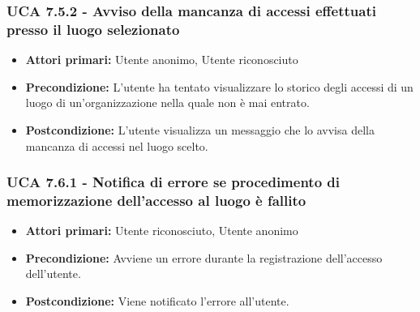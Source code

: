 \subsubsection{UCA 7.5.2 - Avviso della mancanza di accessi effettuati presso il luogo selezionato}
\begin{itemize}
    \item \textbf{Attori primari:} Utente anonimo, Utente riconosciuto
    \item \textbf{Precondizione:} L'utente ha tentato visualizzare lo storico degli accessi di un luogo di un'organizzazione nella quale non è mai entrato.
    \item \textbf{Postcondizione:} L'utente visualizza un messaggio che lo avvisa della mancanza di accessi nel luogo scelto.
\end{itemize}

\subsubsection{UCA 7.6.1 - Notifica di errore se procedimento di memorizzazione dell'accesso al luogo è fallito}
\begin{itemize}
	\item \textbf{Attori primari:} Utente riconosciuto, Utente anonimo
	\item \textbf{Precondizione:} Avviene un errore durante la registrazione dell'accesso dell'utente.
	\item \textbf{Postcondizione:} Viene notificato l'errore all'utente.
\end{itemize}